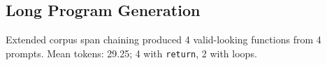 \subsection{Long Program Generation}
Extended corpus span chaining produced 4 valid-looking functions from 4 prompts.
Mean tokens: 29.25; 4 with \texttt{return}, 2 with loops.
